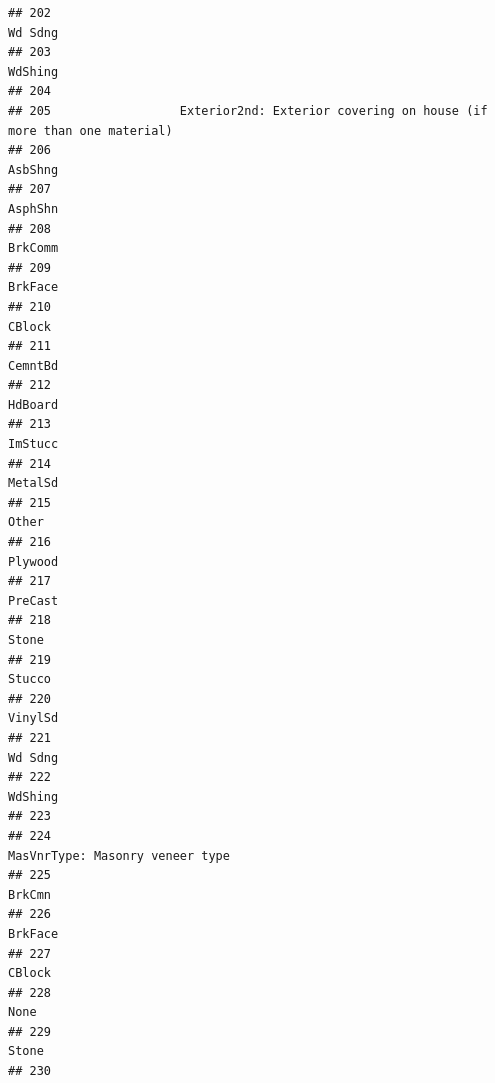 \documentclass[
]{article}
\begin{document}
\begin{verbatim}
## 202                                                                              Wd Sdng
## 203                                                                              WdShing
## 204                                                                                     
## 205                  Exterior2nd: Exterior covering on house (if more than one material)
## 206                                                                              AsbShng
## 207                                                                              AsphShn
## 208                                                                              BrkComm
## 209                                                                              BrkFace
## 210                                                                               CBlock
## 211                                                                              CemntBd
## 212                                                                              HdBoard
## 213                                                                              ImStucc
## 214                                                                              MetalSd
## 215                                                                                Other
## 216                                                                              Plywood
## 217                                                                              PreCast
## 218                                                                                Stone
## 219                                                                               Stucco
## 220                                                                              VinylSd
## 221                                                                              Wd Sdng
## 222                                                                              WdShing
## 223                                                                                     
## 224                                                      MasVnrType: Masonry veneer type
## 225                                                                               BrkCmn
## 226                                                                              BrkFace
## 227                                                                               CBlock
## 228                                                                                 None
## 229                                                                                Stone
## 230                                                                                     

\end{verbatim}
\end{document}
